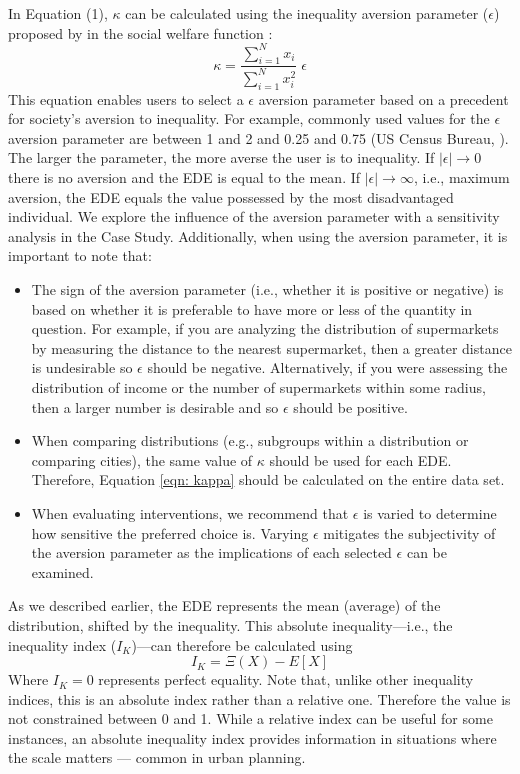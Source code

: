 \documentclass[final,3p,times,onecolumn,sort&compress]{elsarticle}
\begin{document}
In Equation (1), $\kappa$ can be calculated using the inequality aversion parameter ($\epsilon$) proposed by \cite{Atkinson1970-mr} in the social welfare function \citep{Sheriff2020-ge}:
\begin{equation}
    \label{eqn: kappa}
    \kappa = \frac{\sum_{i=1}^N x_i}{\sum_{i=1}^N x_i^2} \; \epsilon 
\end{equation}
This equation enables users to select a $\epsilon$ aversion parameter based on a precedent for society's aversion to inequality.
For example, commonly used values for the $\epsilon$ aversion parameter are between 1 and 2 \citep{Atkinson1970-mr} and 0.25 and 0.75 (US Census Bureau, \cite{Jones2000-xv}).
The larger the parameter, the more averse the user is to inequality.
If $\left| \epsilon \right| \rightarrow 0$ there is no aversion and the EDE is equal to the mean.
If $\left| \epsilon \right| \rightarrow \infty $, i.e., maximum aversion, the EDE equals the value possessed by the most disadvantaged individual. 
We explore the influence of the aversion parameter with a sensitivity analysis in the Case Study.
Additionally, when using the aversion parameter, it is important to note that:
\begin{itemize}
    \item The sign of the aversion parameter (i.e., whether it is positive or negative) is based on whether it is preferable to have more or less of the quantity in question.
    For example, if you are analyzing the distribution of supermarkets by measuring the distance to the nearest supermarket, then a greater distance is undesirable so $\epsilon$ should be negative.
    Alternatively, if you were assessing the distribution of income or the number of supermarkets within some radius, then a larger number is desirable and so $\epsilon$ should be positive.
    \item When comparing distributions (e.g., subgroups within a distribution or comparing cities), the same value of $\kappa$ should be used for each EDE. Therefore, Equation \ref{eqn: kappa} should be calculated on the entire data set.
    \item When evaluating interventions, we recommend that $\epsilon$ is varied to determine how sensitive the preferred choice is. Varying $\epsilon$ mitigates the subjectivity of the aversion parameter as the implications of each selected $\epsilon$ can be examined.
\end{itemize}

As we described earlier, the EDE represents the mean (average) of the distribution, shifted by the inequality.
This absolute inequality---i.e., the inequality index ($I_K$)---can therefore be calculated using
\begin{equation}
    I_K = \Xi(X) - E[X]
\end{equation}
Where $I_K = 0$ represents perfect equality.
Note that, unlike other inequality indices, this is an absolute index rather than a relative one.
Therefore the value is not constrained between 0 and 1.
While a relative index can be useful for some instances, an absolute inequality index provides information in situations where the scale matters --- common in urban planning.
\end{document}
